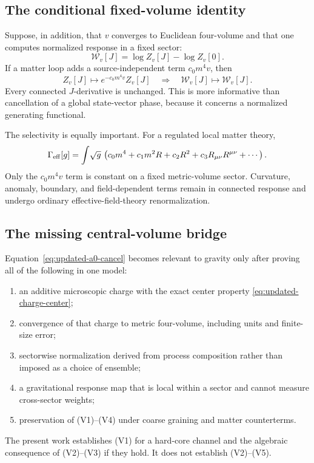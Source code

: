 \subsection{The conditional fixed-volume identity}

Suppose, in addition, that \(v\) converges to Euclidean four-volume and that
one computes normalized response in a fixed sector:
\[
 \mathcal W_v[J]=\log Z_v[J]-\log Z_v[0].
\]
If a matter loop adds a source-independent term \(c_0m^4v\), then
\begin{equation}
 Z_v[J]\mapsto e^{-c_0m^4v}Z_v[J]
 \quad\Longrightarrow\quad
 \mathcal W_v[J]\mapsto\mathcal W_v[J].
 \label{eq:updated-a0-cancel}
\end{equation}
Every connected \(J\)-derivative is unchanged.  This is more informative
than cancellation of a global state-vector phase, because it concerns a
normalized generating functional.

The selectivity is equally important.  For a regulated local matter theory,
\begin{equation}
 \Gamma_{\rm eff}[g]
 =\int\!\sqrt g\,
 \left(c_0m^4+c_1m^2R+c_2R^2
 +c_3R_{\mu\nu}R^{\mu\nu}+\cdots\right).
 \label{eq:updated-heat-kernel}
\end{equation}
Only the \(c_0m^4v\) term is constant on a fixed metric-volume sector.
Curvature, anomaly, boundary, and field-dependent terms remain in connected
response and undergo ordinary effective-field-theory renormalization.

\subsection{The missing central-volume bridge}

Equation~\eqref{eq:updated-a0-cancel} becomes relevant to gravity only after
proving all of the following in one model:
\begin{enumerate}[label=(V\arabic*)]
\item an additive microscopic charge with the exact center property
\eqref{eq:updated-charge-center};
\item convergence of that charge to metric four-volume, including units and
finite-size error;
\item sectorwise normalization derived from process composition rather than
imposed as a choice of ensemble;
\item a gravitational response map that is local within a sector and cannot
measure cross-sector weights;
\item preservation of (V1)--(V4) under coarse graining and matter
counterterms.
\end{enumerate}
The present work establishes (V1) for a hard-core channel and the algebraic
consequence of (V2)--(V3) if they hold.  It does not establish (V2)--(V5).

